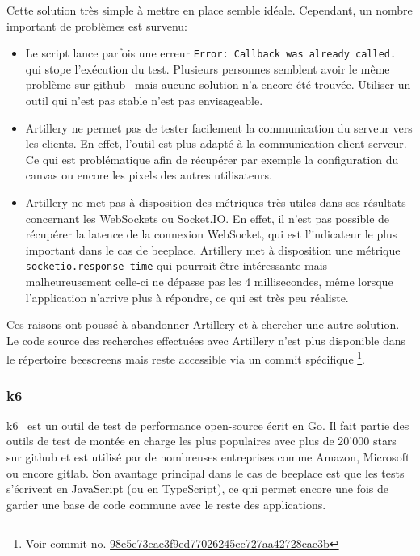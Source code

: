 Cette solution très simple à mettre en place semble idéale. Cependant, un nombre important de problèmes est survenu:

\begin{itemize}
  \item Le script lance parfois une erreur \texttt{Error: Callback was already called.} qui stope l'exécution du test. Plusieurs personnes semblent avoir le même problème sur \gls{github}~\cite{artillery-callback-issue} mais aucune solution n'a encore été trouvée. Utiliser un outil qui n'est pas stable n'est pas envisageable.
  \item Artillery ne permet pas de tester facilement la communication du serveur vers les clients. En effet, l'outil est plus adapté à la communication client-serveur. Ce qui est problématique afin de récupérer par exemple la configuration du canvas ou encore les pixels des autres utilisateurs.
  \item Artillery ne met pas à disposition des métriques très utiles dans ses résultats concernant les WebSockets ou Socket.IO. En effet, il n'est pas possible de récupérer la latence de la connexion WebSocket, qui est l'indicateur le plus important dans le cas de \gls{beeplace}. Artillery met à disposition une métrique \texttt{socketio.response_time} qui pourrait être intéressante mais malheureusement celle-ci ne dépasse pas les 4 millisecondes, même lorsque l'application n'arrive plus à répondre, ce qui est très peu réaliste.
\end{itemize}

Ces raisons ont poussé à abandonner Artillery et à chercher une autre solution. Le code source des recherches effectuées avec Artillery n'est plus disponible dans le répertoire \gls{beescreens} mais reste accessible via un commit spécifique \footnote{Voir commit no. \href{https://gitlab.com/beescreens/beescreens/-/merge_requests/255/diffs?commit_id=98e5e73eae3f9ed77026245cc727aa42728cac3b}{98e5e73eae3f9ed77026245cc727aa42728cac3b}}.

\subsubsection{k6}

k6~\cite{k6} est un outil de test de performance open-source écrit en Go. Il fait partie des outils de test de montée en charge les plus populaires avec plus de 20'000 stars sur \gls{github} et est utilisé par de nombreuses entreprises comme Amazon, Microsoft ou encore \gls{gitlab}. Son avantage principal dans le cas de \gls{beeplace} est que les tests s'écrivent en JavaScript (ou en TypeScript), ce qui permet encore une fois de garder une base de code commune avec le reste des applications.

